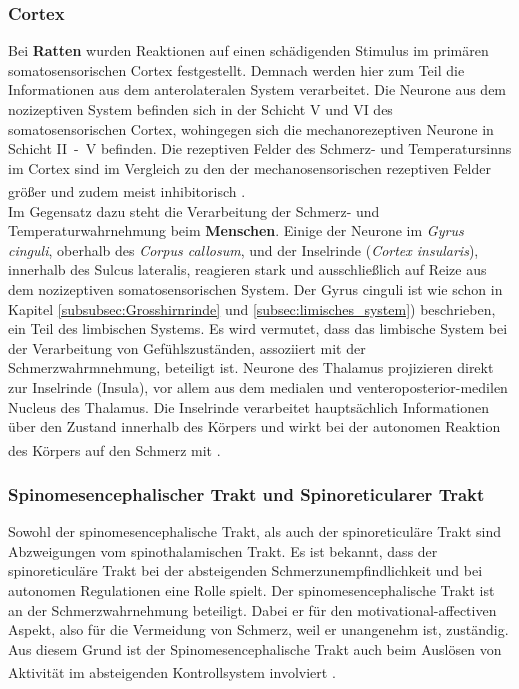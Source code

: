 \documentclass[12pt,a4paper,pdftex]{article}
\begin{document}
\subsubsection*{Cortex}
Bei \textbf{Ratten} wurden Reaktionen auf einen schädigenden Stimulus im primären somatosensorischen Cortex festgestellt. Demnach werden hier zum Teil die Informationen aus dem anterolateralen System verarbeitet. Die Neurone aus dem nozizeptiven System befinden sich in der Schicht V und VI des somatosensorischen Cortex, wohingegen sich die mechanorezeptiven Neurone in Schicht II~-~V befinden. Die rezeptiven Felder des Schmerz- und Temperatursinns im Cortex sind im Vergleich zu den der mechanosensorischen rezeptiven Felder größer und zudem meist inhibitorisch \textsuperscript{\cite[25]{paxinos2014rat}}.
\\
\noindent Im Gegensatz dazu steht die Verarbeitung der Schmerz- und  Temperaturwahrnehmung beim \textbf{Menschen}. Einige der Neurone im \textit{Gyrus cinguli}, oberhalb des \textit{Corpus callosum}, und der Inselrinde (\textit{Cortex insularis}), innerhalb des Sulcus lateralis, reagieren stark und ausschließlich auf Reize aus dem nozizeptiven somatosensorischen System. Der Gyrus cinguli ist wie schon in Kapitel \ref{subsubsec:Grosshirnrinde} und \ref{subsec:limisches_system}) beschrieben, ein Teil des limbischen Systems. Es wird vermutet, dass das limbische System bei der Verarbeitung von Gefühlszuständen, assoziiert mit der Schmerzwahrmnehmung, beteiligt ist. Neurone des Thalamus projizieren direkt zur Inselrinde (Insula), vor allem aus dem medialen und venteroposterior-medilen Nucleus des Thalamus. Die Inselrinde verarbeitet hauptsächlich Informationen über den Zustand innerhalb des Körpers und wirkt bei der autonomen Reaktion des Körpers auf den Schmerz mit \textsuperscript{\cite[24]{kandel2013principles}}.

\subsubsection*{Spinomesencephalischer Trakt und  Spinoreticularer Trakt}

Sowohl der spinomesencephalische Trakt, als auch der spinoreticuläre Trakt sind Abzweigungen vom spinothalamischen Trakt. Es ist bekannt, dass der spinoreticuläre Trakt bei der absteigenden Schmerzunempfindlichkeit und bei autonomen Regulationen eine Rolle spielt. Der spinomesencephalische Trakt ist an der Schmerzwahrnehmung beteiligt. Dabei er für den motivational-affectiven Aspekt, also für die Vermeidung von Schmerz, weil er unangenehm ist, zuständig. Aus diesem Grund ist der Spinomesencephalische Trakt auch beim Auslösen von Aktivität im absteigenden Kontrollsystem involviert \textsuperscript{\cite[24]{kandel2013principles}}.
\end{document}

